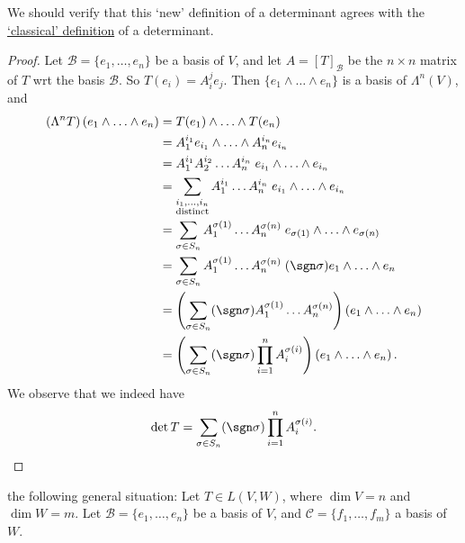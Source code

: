 \documentclass[notoc,notitlepage]{tufte-book}
\begin{document}
\begin{note}
  We should verify that this `new' definition of a determinant agrees with the
  \href{https://en.wikipedia.org/wiki/Determinant\#n_\%C3\%97_n_matrices}{`classical' definition}
  of a determinant.
\end{note}

\begin{proof}
  Let $\mathcal{B} = \{ e_1, \ldots, e_n \}$ be a basis of $V$, and let
  $A = [T]_{\mathcal{B}}$ be the $n \times n$ matrix of $T$ wrt the basis
  $\mathcal{B}$. So $T(e_i) = A_i^j e_j$. Then $\{ e_1 \land \hdots \land e_n \}$
  is a basis of $\Lambda^n(V)$, and
  \begin{align*}
    \left( \Lambda^n T \right)(e_1 \land \hdots \land e_n)
    &= T(e_1) \land \hdots \land T(e_n) \\
    &= A_1^{i_1} e_{i_1} \land \hdots \land A_n^{i_n} e_{i_n} \\
    &= A_1^{i_1} A_2^{i_2} \hdots A_n^{i_n} \; e_{i_1} \land \hdots \land e_{i_n} \\
    &= \sum_{\substack{i_1, \ldots, i_n \\ \text{distinct}}} A_1^{i_1} \hdots A_n^{i_n} \;
      e_{i_1} \land \hdots \land e_{i_n} \\
    &= \sum_{\sigma \in S_n} A_1^{\sigma(1)} \hdots A_n^{\sigma(n)} \;
      e_{\sigma(1)} \land \hdots \land e_{\sigma(n)} \\
    &= \sum_{\sigma \in S_n} A_1^{\sigma(1)} \hdots A_n^{\sigma(n)} \;
      (\sgn \sigma) e_1 \land \hdots \land e_n \\
    &= \left( \sum_{\sigma \in S_n} (\sgn \sigma) A_1^{\sigma(1)} \hdots A_n^{\sigma(n)} \right)
      \left( e_1 \land \hdots \land e_n \right) \\
    &= \left( \sum_{\sigma \in S_n} (\sgn \sigma) \prod_{i = 1}^{n} A_i^{\sigma(i)} \right)
      \left( e_1 \land \hdots \land e_n \right).
  \end{align*}
  We observe that we indeed have
  \begin{equation*}
    \det T = \sum_{\sigma \in S_n} (\sgn \sigma) \prod_{i = 1}^{n} A_i^{\sigma(i)}.
  \end{equation*}
\end{proof}

 the following general situation: Let $T \in L(V, W)$,
where $\dim V = n$ and $\dim W = m$. Let $\mathcal{B} = \{ e_1, \ldots, e_n \}$
be a basis of $V$, and $\mathcal{C} = \{ f_1, \ldots, f_m \}$ a basis of $W$.
\end{document}
